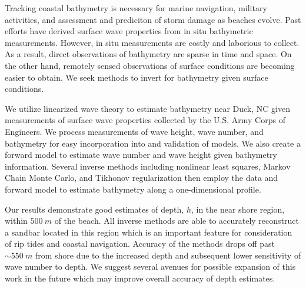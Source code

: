 Tracking coastal bathymetry is necessary for marine navigation, military activities, and assessment and prediciton of storm damage as beaches evolve. Past efforts have derived surface wave properties from in situ bathymetric measurements. However, in situ measurements are costly and laborious to collect. As a result, direct observations of bathymetry are sparse in time and space. On the other hand, remotely sensed observations of surface conditions are becoming easier to obtain. We seek methods to invert for bathymetry given surface conditions. 

We utilize linearized wave theory to estimate bathymetry near Duck, NC given measurements of surface wave properties collected by the U.S. Army Corps of Engineers. We process measurements of wave height, wave number, and bathymetry for easy incorporation into and validation of models. We also create a forward model to estimate wave number and wave height given bathymetry information. Several inverse methods including nonlinear least squares, Markov Chain Monte Carlo, and Tikhonov regularization then employ the data and forward model to estimate bathymetry along a one-dimensional profile.

Our results demonstrate good estimates of depth, $h$, in the near shore region, within $500~m$ of the beach. All inverse methods are able to accurately reconstruct a sandbar located in this region which is an important feature for consideration of rip tides and coastal navigation. Accuracy of the methods drops off past $\sim550~m$ from shore due to the increased depth and subsequent lower sensitivity of wave number to depth. We suggest several avenues for possible expansion of this work in the future which may improve overall accuracy of depth estimates.